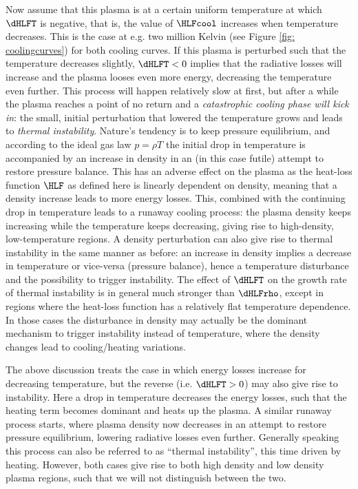 Now assume that this plasma is at a certain uniform temperature at which $\dHLFT$ is negative, that is, the value of $\HLFcool$ increases when temperature decreases. This is the case at e.g. two million Kelvin (see Figure \ref{fig: coolingcurves}) for both cooling curves. If this plasma is perturbed such that the temperature decreases slightly, $\dHLFT < 0$ implies that the radiative losses will increase and the plasma looses even more energy, decreasing the temperature even further. This process will happen relatively slow at first, but after a while the plasma reaches a point of no return and a \emph{catastrophic cooling phase will kick in}: the small, initial perturbation that lowered the temperature grows and leads to \emph{thermal instability}. Nature's tendency is to keep pressure equilibrium, and according to the ideal gas law $p = \rho T$ the initial drop in temperature is accompanied by an increase in density in an (in this case futile) attempt to restore pressure balance. This has an adverse effect on the plasma as the heat-loss function $\HLF$ as defined here is linearly dependent on density, meaning that a density increase leads to more energy losses. This, combined with the continuing drop in temperature leads to a runaway cooling process: the plasma density keeps increasing while the temperature keeps decreasing, giving rise to high-density, low-temperature regions.
A density perturbation can also give rise to thermal instability in the same manner as before: an increase in density implies a decrease in temperature or vice-versa (pressure balance), hence a temperature disturbance and the possibility to trigger instability. The effect of $\dHLFT$ on the growth rate of thermal instability is in general much stronger than $\dHLFrho$, except in regions where the heat-loss function has a relatively flat temperature dependence. In those cases the disturbance in density may actually be the dominant mechanism to trigger instability instead of temperature, where the density changes lead to cooling/heating variations.

The above discussion treats the case in which energy losses increase for decreasing temperature, but the reverse (i.e. $\dHLFT > 0$) may also give rise to instability. Here a drop in temperature decreases the energy losses, such that the heating term becomes dominant and heats up the plasma. A similar runaway process starts, where plasma density now decreases in an attempt to restore pressure equilibrium, lowering radiative losses even further. Generally speaking this process can also be referred to as ``thermal instability'', this time driven by heating. However, both cases give rise to both high density and low density plasma regions, such that we will not distinguish between the two.

